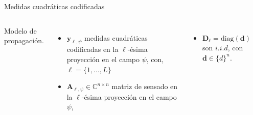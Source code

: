\documentclass[aspectratio=169,t,xcolor=table]{beamer}
\begin{document}
\begin{frame}{Medidas cuadráticas codificadas}
\begin{columns}
\begin{block}{\scriptsize  Modelo de propagación.}
       \end{block}
        \begin{itemize}
        \item $\mathbf{y}_{\ell, \psi}$ medidas cuadráticas codificadas en la $\ell$-ésima proyección en el campo $\psi$, con, $\ell=\{1,\dots,L\}$
        \item $\mathbf{A}_{\ell, \psi}\in\mathbb{C}^{n\times n}$ matriz de sensado en la $\ell$-ésima proyección en el campo $\psi$,
        \end{itemize}
    \begin{itemize}
    \item $\mathbf{D}_{\ell} = \mathrm{diag}(\mathbf{d})$ son $i.i.d$, con $\mathbf{d} \in \{d\}^{n}$.
    \end{itemize}
    \begin{table}[]
    \centering
    \renewcommand*{\arraystretch}{1.5}
    \label{tab:comp_class_models}
    \end{table}
\end{columns}
\end{frame}
\end{document}
